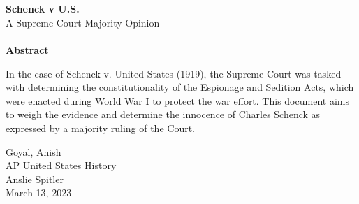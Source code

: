 \begin{titlepage}
\begin{center}




~\\[2.5cm]

\HRule \\[0.4cm]
{ \Large \bfseries Schenck v U.S.}\\
{   A Supreme Court Majority Opinion}\\[0.4cm]

\HRule \\[0.5cm]



\textbf{Abstract} \\

\begin{flushleft}
\begin{spacing}{1.0}

{\small
In the case of Schenck v. United States (1919), the Supreme Court was tasked with determining the constitutionality of the Espionage and Sedition Acts, which were enacted during World War I to protect the war effort. This document aims to weigh the evidence and determine the innocence of Charles Schenck as expressed by a majority ruling of the Court.}\\

\end{spacing}
\end{flushleft}

\vfill

\begin{flushright}
\small {Goyal, Anish \\}
\large AP United States History \\
\large Anslie Spitler\\
{\large March 13, 2023}
\end{flushright}

\end{center}
\end{titlepage}